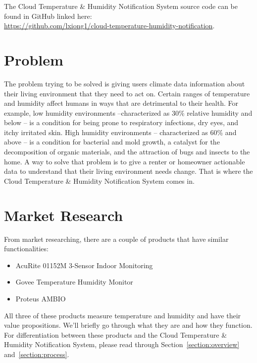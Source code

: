 \documentclass{article}
\begin{document}
The Cloud Temperature \& Humidity Notification System source code can be found in GitHub linked here: \\

\url{https://github.com/lxiong1/cloud-temperature-humidity-notification}.

\section{Problem}
The problem trying to be solved is giving users climate data information about their living environment that they need to act on. Certain ranges of temperature and humidity affect humans in ways that are detrimental to their health. For example, low humidity environments --characterized as 30\% relative humidity and below -- is a condition for being prone to respiratory infections, dry eyes, and itchy irritated skin. High humidity environments -- characterized as 60\% and above -- is a condition for bacterial and mold growth, a catalyst for the decomposition of organic materials, and the attraction of bugs and insects to the home. A way to solve that problem is to give a renter or homeowner actionable data to understand that their living environment needs change. That is where the Cloud Temperature \& Humidity Notification System comes in.

\section{Market Research}
From market researching, there are a couple of products that have similar functionalities:

\begin{itemize}
	\setlength{\itemindent}{.3in}
	\item AcuRite 01152M 3-Sensor Indoor Monitoring
	\item Govee Temperature Humidity Monitor
	\item Proteus AMBIO
\end{itemize}

All three of these products measure temperature and humidity and have their value propositions. We'll briefly go through what they are and how they function. For differentiation between these products and the Cloud Temperature \& Humidity Notification System, please read through Section~\ref{section:overview} and~\ref{section:process}.
\end{document}
